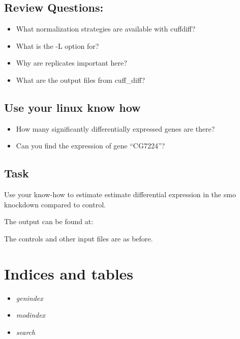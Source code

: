 \documentclass[letterpaper,10pt,english]{sphinxmanual}
\begin{document}
\section{Review Questions:}
\label{STEP4_CUFFLINKS_DE:id1}\begin{itemize}
\item {} 
What normalization strategies are available with cuffdiff?

\item {} 
What is the -L option for?

\item {} 
Why are replicates important here?

\item {} 
What are the output files from cuff\_diff?

\end{itemize}


\section{Use your linux know how}
\label{STEP4_CUFFLINKS_DE:use-your-linux-know-how}\begin{itemize}
\item {} 
How many significantly differentially expressed genes are there?

\item {} 
Can you find the expression of gene ``CG7224''?

\end{itemize}


\section{Task}
\label{STEP4_CUFFLINKS_DE:id2}
Use your know-how to estimate estimate differential expression in the smo knockdown compared to control.

The output can be found at: 

The controls and other input files are as before.


\chapter{Indices and tables}
\label{IntroToCommandLine:indices-and-tables}\begin{itemize}
\item {} 
\emph{genindex}

\item {} 
\emph{modindex}

\item {} 
\emph{search}

\end{itemize}



\renewcommand{\indexname}{Index}
\printindex
\end{document}
